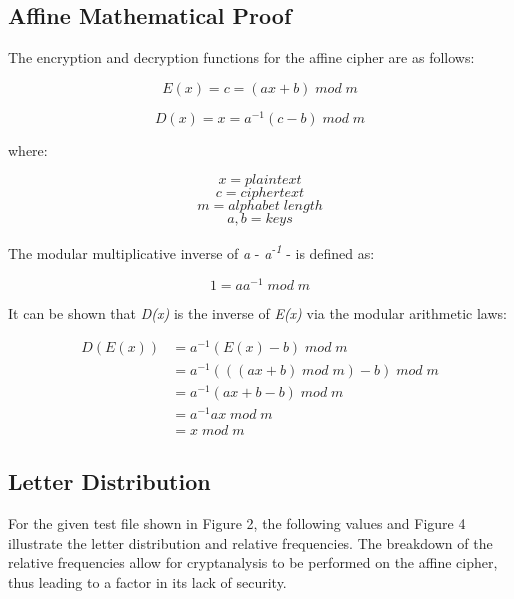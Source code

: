 \documentclass[]{article}
\begin{document}
\newpage
\subsection*{Affine Mathematical Proof}

The encryption and decryption functions for the affine cipher are as follows:

$$E(x)=c=(ax+b)\;mod\;m$$

$$D(x)=x=a^{-1}(c-b)\;mod\;m$$

where:

$$x = plaintext$$
$$c = ciphertext$$
$$m = alphabet\;length$$
$$a,b=keys$$
\vspace{0.5cm}

The modular multiplicative inverse of \textit{a} - \textit{a\textsuperscript{-1}} -  is defined as:

$$1=aa^{-1}\;mod\;m$$

It can be shown that \textit{D(x)} is the inverse of \textit{E(x)} via the modular arithmetic laws:

\begin{equation*}
\begin{split}
D(E(x)) & = a^{-1}(E(x)-b)\;mod\;m \\
& = a^{-1}(( (ax+b)\;mod\;m )-b)\;mod\;m \\
& = a^{-1} (ax+b-b) \;mod\;m \\
& = a^{-1}ax\;mod\;m \\
& = x\;mod\;m
\end{split}
\end{equation*}

\newpage
\subsection*{Letter Distribution}

For the given test file shown in Figure 2, the following values and Figure 4 illustrate the letter distribution and relative frequencies. The breakdown of the relative frequencies allow for cryptanalysis to be performed on the affine cipher, thus leading to a factor in its lack of security.
\end{document}
